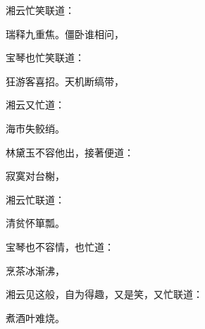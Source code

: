 \begin{parag}
    湘云忙笑联道：
\end{parag}
\begin{poem}
    \begin{pl} 瑞释九重焦。僵卧谁相问，\end{pl}
\end{poem}


\begin{parag}
    宝琴也忙笑联道：
\end{parag}
\begin{poem}
    \begin{pl} 狂游客喜招。天机断缟带，\end{pl}
\end{poem}


\begin{parag}
    湘云又忙道：
\end{parag}
\begin{poem}
    \begin{pl} 海市失鲛绡。\end{pl}
\end{poem}


\begin{parag}
    林黛玉不容他出，接著便道：
\end{parag}
\begin{poem}
    \begin{pl} 寂寞对台榭，\end{pl}
\end{poem}


\begin{parag}
    湘云忙联道：
\end{parag}
\begin{poem}
    \begin{pl} 清贫怀箪瓢。\end{pl}
\end{poem}


\begin{parag}
    宝琴也不容情，也忙道：
\end{parag}
\begin{poem}
    \begin{pl} 烹茶冰渐沸，\end{pl}
\end{poem}


\begin{parag}
    湘云见这般，自为得趣，又是笑，又忙联道：
\end{parag}
\begin{poem}
    \begin{pl} 煮酒叶难烧。\end{pl}
\end{poem}


